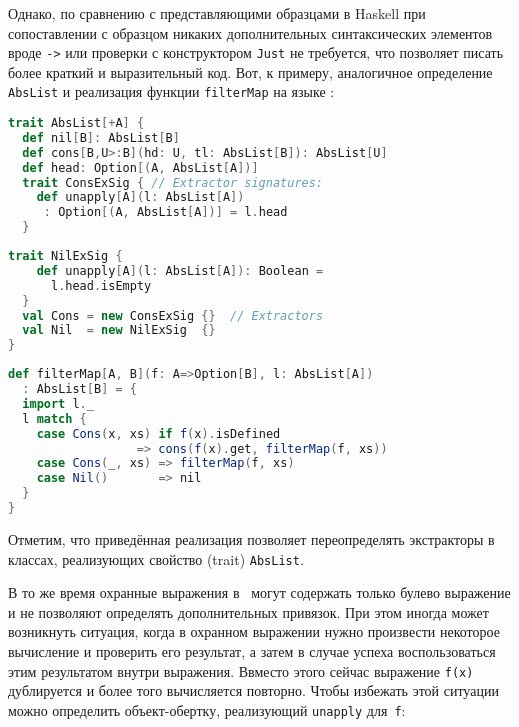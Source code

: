 Однако, по сравнению с представляющими образцами в Haskell при сопоставлении с образцом никаких дополнительных синтаксических элементов вроде \lstinline|->| или проверки с конструктором \lstinline|Just| не требуется, что позволяет писать более краткий и выразительный код. Вот, к примеру, аналогичное определение \lstinline|AbsList| и реализация функции \lstinline|filterMap| на языке \Scala:

\noindent
\begin{minipage}{\linewidth}
\begin{lstlisting}[language=scala]
trait AbsList[+A] {
  def nil[B]: AbsList[B]
  def cons[B,U>:B](hd: U, tl: AbsList[B]): AbsList[U]
  def head: Option[(A, AbsList[A])]
  trait ConsExSig { // Extractor signatures:
    def unapply[A](l: AbsList[A])
     : Option[(A, AbsList[A])] = l.head
  }
\end{lstlisting}
\end{minipage}

\noindent
\begin{minipage}{\linewidth}
\begin{lstlisting}[language=scala]
  trait NilExSig {
    def unapply[A](l: AbsList[A]): Boolean = 
      l.head.isEmpty
  }
  val Cons = new ConsExSig {}  // Extractors
  val Nil  = new NilExSig  {}
}
\end{lstlisting}
\end{minipage}

\noindent
\begin{minipage}{\linewidth}
\begin{lstlisting}[language=scala]
def filterMap[A, B](f: A=>Option[B], l: AbsList[A])
  : AbsList[B] = {
  import l._
  l match {
    case Cons(x, xs) if f(x).isDefined
                  => cons(f(x).get, filterMap(f, xs))
    case Cons(_, xs) => filterMap(f, xs)
    case Nil()       => nil
  }
}
\end{lstlisting}
\end{minipage}

Отметим, что приведённая реализация позволяет переопределять экстракторы в классах, реализующих свойство (trait) \lstinline|AbsList|.

В то же время охранные выражения в \Scala~могут содержать только булево выражение и не позволяют определять дополнительных привязок. При этом иногда
может возникнуть ситуация, когда в охранном выражении нужно произвести некоторое вычисление и проверить его результат, а затем в случае успеха воспользоваться этим результатом внутри выражения. Ввместо этого сейчас выражение \lstinline|f(x)| дублируется и более того вычисляется повторно. Чтобы избежать этой ситуации можно определить объект-обертку, реализующий \lstinline|unapply| \mbox{для \lstinline|f|:}


